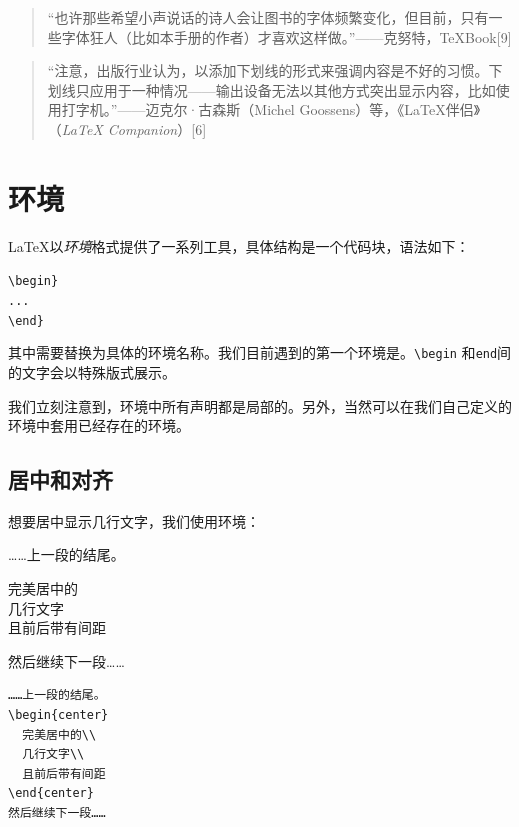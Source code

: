 \begin{quote}
    “也许那些希望{\tiny 小声说话}的诗人会让图书的字体频繁变化，但目前，只有一些字体狂人{\tiny （比如本手册的作者）}才喜欢这样做。”——克努特，\TeX Book[9]
\end{quote}

\begin{quote}
    “注意，出版行业认为，以添加下划线的形式来强调内容是不好的习惯。下划线只应用于一种情况——输出设备无法以其他方式突出显示内容，比如使用打字机。”——迈克尔·古森斯（Michel Goossens）等，《\LaTeX 伴侣》（\emph{\LaTeX{} Companion}）[6]
\end{quote}

\section{环境}

\LaTeX 以\emph{环境}格式提供了一系列工具，具体结构是一个代码块，语法如下：

\begin{dmd}
    \verb+\begin+\verb|}|\\
    \verb|...|\\
    \verb+\end+\verb|}|\\
\end{dmd}

其中需要替换为具体的环境名称。我们目前遇到的第一个环境是。\verb|\begin| 和\verb|end|间的文字会以特殊版式展示。

\begin{exclamation}
    我们立刻注意到，环境中所有声明都是局部的。另外，当然可以在我们自己定义的环境中套用已经存在的环境。
\end{exclamation}

\subsection{居中和对齐}

想要居中显示几行文字，我们使用环境：

\begin{codelist}[2.5]{
    ……上一段的结尾。
    \begin{center}
        完美居中的\\
        几行文字\\
        且前后带有间距
    \end{center}
    然后继续下一段……
}\begin{verbatim}……上一段的结尾。
\begin{center}
  完美居中的\\
  几行文字\\
  且前后带有间距
\end{center}
然后继续下一段……
\end{verbatim}
\end{codelist}

